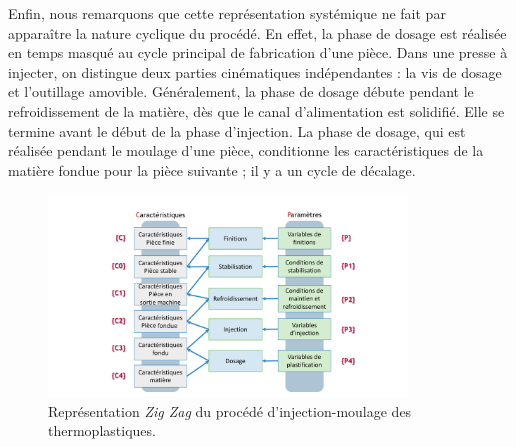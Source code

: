 
Enfin, nous remarquons que cette représentation systémique ne fait par apparaître la nature cyclique du procédé.
En effet, la phase de dosage est réalisée en temps masqué au cycle principal de fabrication d'une pièce.
Dans une presse à injecter, on distingue deux parties cinématiques indépendantes : la vis de dosage et l'outillage amovible.
Généralement, la phase de dosage débute pendant le refroidissement de la matière, dès que le canal d’alimentation est solidifié.
Elle se termine avant le début de la phase d'injection.
La phase de dosage, qui est réalisée pendant le moulage d'une pièce, conditionne les caractéristiques de la matière fondue pour la pièce suivante ; il y a un cycle de décalage.

\begin{figure}[hbtp]
	\centering
	\includegraphics[width=0.85\textwidth,height=\textheight,keepaspectratio]{../Chap1/Figures/Sapristi_ZigZag.pdf}
	\caption{Représentation \textit{Zig Zag} du procédé d'injection-moulage des thermoplastiques.}
	\label{fig:zigzag}
\end{figure}

